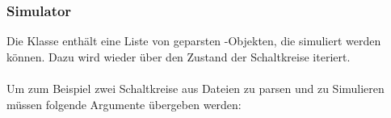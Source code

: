 \subsubsection{Simulator}
Die Klasse  enthält eine Liste von geparsten -Objekten, die simuliert werden können. Dazu wird wieder über den Zustand der Schaltkreise iteriert.
\\\\
Um zum Beispiel zwei Schaltkreise aus Dateien zu parsen und zu Simulieren müssen folgende Argumente übergeben werden:\\
